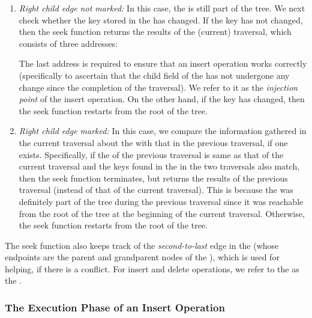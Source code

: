 \begin{limitscope}
\begin{enumerate}[leftmargin=*, label=(\alph*), noitemsep]
\item \emph{Right child edge not marked:}
In this case, the \anchornode{} is still part of the tree. We next check whether the key stored in the \anchornode{} has changed. If the key has not changed, then the seek function returns the results of the (current) traversal, which consists of three addresses:
The last address is required to ensure that an insert operation works correctly (specifically to ascertain that the child field of the \terminalnode{} has not undergone any change since the completion of the traversal). We refer to it as the \emph{injection point} of the insert operation. On the other hand, if the key has changed, then the seek function restarts from the root of the tree. 


\item \emph{Right child edge marked:}
In this case, we compare the information gathered in the current traversal about the \anchornode{} with that in the previous traversal, if one exists. Specifically, if the \anchornode{} of the previous traversal is same as that of the current traversal  and the keys found in the \anchornode{} in the two traversals also match, then the seek function terminates, but returns the results of the previous traversal (instead of that of the current traversal). This is because the \anchornode{} was definitely part of the tree during the previous traversal since it was reachable from the root of the tree at the beginning of the current traversal. Otherwise, the seek function restarts from the root of the tree.  
\end{enumerate}

The seek function also keeps track of the \emph{second-to-last} edge in the \accesspath{} (whose endpoints are the parent and grandparent nodes of the \terminalnode), which 
is used for helping, if there is a conflict. For insert and delete operations, we refer to the \terminalnode{} as the \emph{\targetnode}. 

\subsubsection{The Execution Phase of an Insert Operation}


\end{limitscope}
